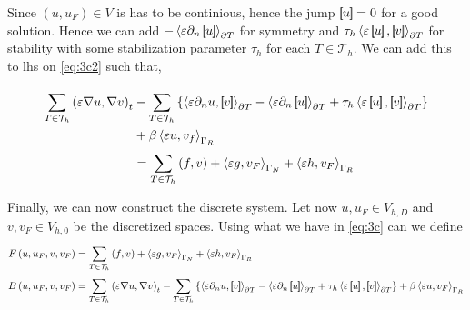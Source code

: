 

Since $\left( u, u_{F} \right) \in V $ is has to be continious, hence the jump $\left[\!\!\left[ u \right]\!\!\right] = 0$ for a good solution. Hence
we can add $-\left<\varepsilon \partial _{n} \left[\!\!\left[ u \right]\!\!\right] \right>_{\partial T}$ for symmetry and $ \tau _{h} \left<\varepsilon \jump{u},
\jump{v} \right>_{\partial T}$ for stability with some stabilization parameter $\tau _{h}$ for each $T \in  \mathcal{T}_{h} $. We can add this to lhs on \eqref{eq:3c2} such that,

\begin{equation}
\label{eq:3c}
\begin{split}
    \sum_{T \in \mathcal{T} _{h}}^{}   \left( \varepsilon \nabla u, \nabla v \right) _{t} &-\sum_{T \in \mathcal{T} _{h}}^{}
\left\{ \left<\varepsilon  \partial
_{n} u , \jump{ v } \right> _{\partial T}  -\left<\varepsilon
\partial _{n} \jump{u} \right>_{\partial T}  + \tau _{h} \left<\varepsilon \jump{u},
\jump{v} \right>_{\partial T} \right\}  \\ &+ \beta  \left< \varepsilon u, v_{f}  \right>_{\Gamma _{R}} \\
                                           &= \sum_{T
\in \mathcal{T} _{h}}^{} \left( f,v \right)  + \left<\varepsilon g, v_{F} \right>_{\Gamma _{N}} + \left<\varepsilon h,
v_{F} \right>_{\Gamma _{R}}
\end{split}
\end{equation}



Finally, we can now construct the discrete system. Let now $u, u_{F} \in V_{h,D}$ and $v, v_{F} \in V_{h,0}$ be the
discretized spaces. Using what we have in \eqref{eq:3c} can we define \[
    \begin{split}
F\left( u, u_{F}, v, v_{F} \right) & =  \sum_{T
\in \mathcal{T} _{h}}^{} \left( f,v \right)  + \left<\varepsilon g, v_{F} \right>_{\Gamma _{N}} + \left<\varepsilon h,
v_{F} \right>_{\Gamma _{R}} \\
B\left( u, u_{F} , v, v_{F} \right)  &=
    \sum_{T \in \mathcal{T} _{h}}^{}   \left( \varepsilon \nabla u, \nabla v \right) _{t} -\sum_{T \in \mathcal{T} _{h}}^{}
\left\{ \left<\varepsilon  \partial
_{n} u , \jump{ v } \right> _{\partial T}  -\left<\varepsilon
\partial _{n} \jump{u} \right>_{\partial T}  + \tau _{h} \left<\varepsilon \jump{u},
\jump{v} \right>_{\partial T} \right\}  + \beta  \left< \varepsilon u, v_{F}  \right>_{\Gamma _{R}} \\
    \end{split}
\]

